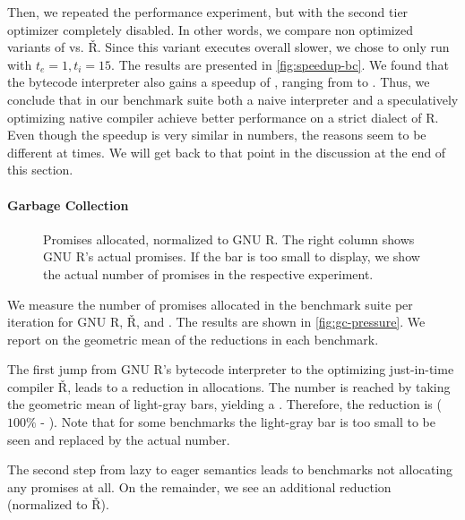 \documentclass[review,creen,acmsmall]{acmart}
\renewcommand{\Rsh}{{\sf\v R}\xspace}
\begin{document}
Then, we repeated the performance experiment, but with the second tier optimizer
completely disabled. In other words, we compare non optimized variants of
\rshstrict vs. \Rsh. Since this variant executes overall \rshBCSlowdown slower,
we chose to only run with $t_e = 1, t_i = 15$. The results are presented in
\autoref{fig:speedup-bc}. We found that the bytecode interpreter also gains a
speedup of \speedupBCRshStrict, ranging from \speedupBCRshStrictMin to
\speedupBCRshStrictMax.
%
Thus, we conclude that in our benchmark suite both a naive interpreter and a
speculatively optimizing native compiler achieve better performance on a strict
dialect of R. Even though the speedup is very similar in numbers, the reasons
seem to be different at times. We will get back to that point in the discussion
at the end of this section.

\paragraph{Garbage Collection}

\begin{figure}[h]
  \centering
  
  \caption{Promises allocated, normalized to GNU R. The right column shows GNU R's actual promises. If the bar is too small to display, we show the actual number of promises in the respective experiment.}
  \label{fig:gc-pressure}
\end{figure}

We measure the number of promises allocated in the benchmark suite per iteration
for GNU R, \Rsh, and \rshstrict. The results are shown in
\autoref{fig:gc-pressure}. We report on the geometric mean of the reductions in
each benchmark.

The first jump from GNU R's bytecode interpreter to the optimizing just-in-time
compiler \Rsh, leads to a \promiseAlocationReductionGnurRsh reduction in
allocations. The number is reached by taking the geometric mean of light-gray
bars, yielding a \promiseAllocationGnurRsh. Therefore, the reduction is
\promiseAlocationReductionGnurRsh ({$100\%$\xspace} -
\promiseAllocationGnurRsh). Note that for some benchmarks the light-gray bar is
too small to be seen and replaced by the actual number.

The second step from lazy to eager semantics leads to
\promiseAlocationReductionRshStrictToZero benchmarks not allocating any promises
at all. On the remainder, we see an additional
\promiseAlocationReductionRshStrict reduction (\rshstrict normalized to \Rsh).
\end{document}
